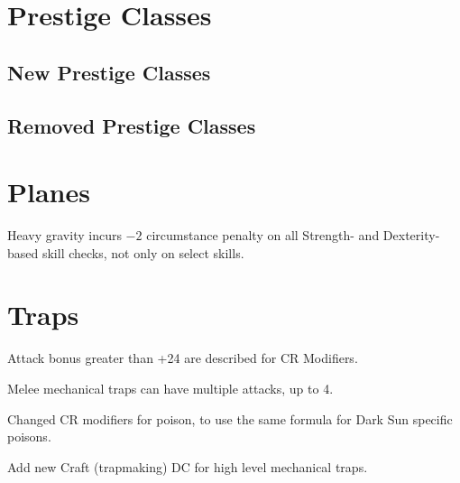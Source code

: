 \section{Prestige Classes}

\subsection{New Prestige Classes}

\subsection{Removed Prestige Classes}

\section{Planes}
Heavy gravity incurs $-2$ circumstance penalty on all Strength- and Dexterity-based skill checks, not only on select skills.

\section{Traps}
\begin{itemize*}
\item Attack bonus greater than +24 are described for CR Modifiers.
\item Melee mechanical traps can have multiple attacks, up to 4.
\item Changed CR modifiers for poison, to use the same formula for {\tableheader Dark Sun} specific poisons.
\item Add new Craft (trapmaking) DC for high level mechanical traps.
\end{itemize*}

